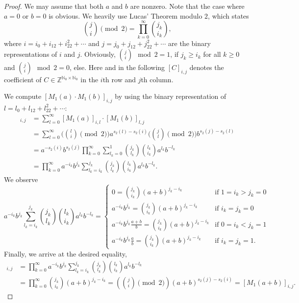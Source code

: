 \documentclass{article}
\newcommand{\NN}{\mathbb N}
\newcommand{\ZZ}{\mathbb Z}
\begin{document}
	\begin{proof}We may assume that both $a$ and $b$ are nonzero. Note that the case where $a=0$ or $b=0$ is obvious. 
	We heavily use Lucas' Theorem modulo $2$, which states 
	\begin{equation}\label{eq:LT}
	\binom{j}{i}\pmod{2}=\prod_{k=0}^\infty\binom{j_k}{i_k},
	\end{equation}
	where $i=i_0+i_12+i_22^2+\cdots$ and $j=j_0+j_12+j_22^2+\cdots$ are the binary representations of $i$ and $j$. 
	Obviously, $\binom{j}{i}\mod{2}=1$, if $j_k\geq i_k$ for all $k\geq 0$ and $\binom{j}{i}\mod{2}=0$, else. 
	Here and in the following $[C]_{i,j}$ denotes the coefficient of $C\in\ZZ^{\NN_0\times \NN_0}$ in the $i$th row and $j$th column. 
	
	We compute $[M_1(a)\cdot M_1(b)]_{i,j}$ by using the binary representation of $l=l_0+l_12+l_22^2+\cdots$:
	\begin{align*}
	[M_1(a)\cdot M_1(b)]_{i,j}&=\sum_{l=0}^\infty [M_1(a)]_{i,l}\cdot [M_1(b)]_{l,j}\\
	&=\sum_{l=0}^\infty\Big(\binom{l}{i}\pmod{2}\Big) a^{s_2(l)-s_2(i)}\Big(\binom{j}{l}\pmod{2}\Big) b^{s_2(j)-s_2(l)}\\
	&=a^{-s_2(i)}b^{s_2(j)}\prod_{k=0}^\infty\sum_{l_k=0}^1\binom{j_k}{l_k}\binom{l_k}{i_k}a^{l_k}b^{-l_k}\\
	&=\prod_{k=0}^\infty a^{-i_k}b^{j_k}\sum_{l_k=i_k}^{j_k}{\binom{j_k}{l_k}\binom{l_k}{i_k}a^{l_k}b^{-l_k}}.
	\end{align*}
We observe 
	$$a^{-i_k}b^{j_k}\sum_{l_k=i_k}^{j_k}{\binom{j_k}{l_k}\binom{l_k}{i_k}a^{l_k}b^{-l_k}}=\left\{\begin{array}{ll}0=\binom{j_k}{i_k}(a+b)^{j_k-i_k}& \mbox{if }1=i_k>j_k=0\\ 
	a^{-i_k}b^{j_k}=\binom{j_k}{i_k}(a+b)^{j_k-i_k}& \mbox{if }i_k=j_k=0\\
	a^{-i_k}b^{j_k}\frac{a+b}{b}=\binom{j_k}{i_k}(a+b)^{j_k-i_k}& \mbox{if }0=i_k<j_k=1\\
		a^{-i_k}b^{j_k}\frac{a}{b}=\binom{j_k}{i_k}(a+b)^{j_k-i_k}& \mbox{if }i_k=j_k=1.
	\end{array}\right.$$
	Finally, we arrive at the desired equality,
	\begin{align*}
	[M_1(a)\cdot M_1(b)]_{i,j}&=\prod_{k=0}^\infty a^{-i_k}b^{j_k}\sum_{l_k=i_k}^{j_k}{\binom{j_k}{l_k}\binom{l_k}{i_k}a^{l_k}b^{-l_k}}\\
	&=\prod_{k=0}^\infty\binom{j_k}{i_k}(a+b)^{j_k-i_k}=(\binom{j}{i}\pmod{2})(a+b)^{s_2(j)-s_2(i)}=[M_1(a+b)]_{i,j}.
	\end{align*}
	\end{proof}
	
\end{document}
